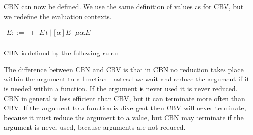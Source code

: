CBN can now be defined.  We use the same definition of values as for CBV,
but we redefine the evaluation contexts.
\begin{center}
  \begin{math}
    \begin{array}{lll}
      E ::= \Box\,|\,E\,t\,|\,[\alpha]E\,|\,\mu \alpha.E\\
    \end{array}
  \end{math}
\end{center}
\begin{definition}
  \label{def:lamu_cbn}
  CBN is defined by the following rules:
  \vspace{-37px}
  \begin{center}
  \end{center}
\end{definition}
\noindent
The difference between CBN and CBV is that in CBN no reduction takes
place within the argument to a function.  Instead we wait and reduce
the argument if it is needed within a function.  If the argument is
never used it is never reduced.  CBN in general is less efficient than
CBV, but it can terminate more often than CBV.  If the argument to a
function is divergent then CBV will never terminate, because it must
reduce the argument to a value, but CBN may terminate if the argument
is never used, because arguments are not reduced.

